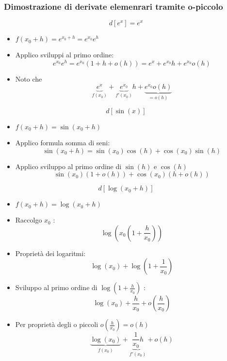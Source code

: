 \subsubsection{Dimostrazione di derivate elemenrari tramite o-piccolo}
\[
	\boxed{	d\left[ e^{x} \right] = e^{x}}
\]
\begin{itemize}
	\item $f\left( x_0 + h \right) = e^{x_0 + h}= e^{x_0 }e ^{ h}$
	\item Applico sviluppi al primo ordine:
	      \[
		      e^{x_0 }e ^{ h}= e^{x_0}\left( 1+h+ o\left( h \right)  \right) = e^{x}+ e^{x_0}h + e^{x_0}o\left( h \right)
	      \]
	\item Noto che
	      \[
		      \underbrace{e^{x}}_{f\left( x_0 \right) }+ \underbrace{e^{x_0}}_{f'\left( x_0 \right) }h + \underbrace{e^{x_0}o\left( h \right)}_{=o\left( h \right) }
	      \]
\end{itemize}
\[
	\boxed{	d\left[ \sin \left( x \right)  \right] }
\]
\begin{itemize}
	\item $f\left( x_0 + h \right) = \sin \left( x_0 + h \right) $
	\item Applico formula somma di seni:
	      \[
		      \sin \left( x_0 +h \right) = \sin \left( x_0  \right) \cos \left( h \right) + \cos \left( x_0 \right) \sin \left( h \right)
	      \]
	\item Applico sviluppo al primo ordine di $\sin \left( h \right)$ e $\cos \left( h \right) $
	      \[
		      \sin \left( x_0 \right) \left( 1+ o\left( h \right)  \right) + \cos \left( x_0 \right) \left( h + o \left( h \right)  \right)
	      \]
\end{itemize}
\[
	\boxed{	d\left[ \log \left( x_0+h \right)  \right]
	}
\]
\begin{itemize}
	\item $f\left( x_0 + h \right) = \log \left( x_0 +h \right) $
	\item Raccolgo $x_0$ :
	      \[
		      \log \left( x_0 \left( 1+ \frac{h}{x_0} \right)  \right)
	      \]
	\item Proprietà dei logaritmi:
	      \[
		      \log \left( x_0 \right) + \log \left( 1 + \frac{1}{x_0} \right)
	      \]
	\item Sviluppo al primo ordine di $\log  \left( 1 + \frac{h}{x_0} \right) $ :
	      \[
		      \log \left( x_0  \right) + \frac{h}{x_0}+ o\left( \frac{h}{x_0} \right)
	      \]
	\item Per proprietà degli o piccoli $o\left( \frac{h}{x_0} \right) = o\left( h \right) $
	      \[
		      \underbrace{\log \left( x_0 \right)}_{f\left( x_0 \right) } + \underbrace{\frac{1}{x_0}h}_{f'\left( x_0 \right) } + o\left( h \right)
	      \]
\end{itemize}
